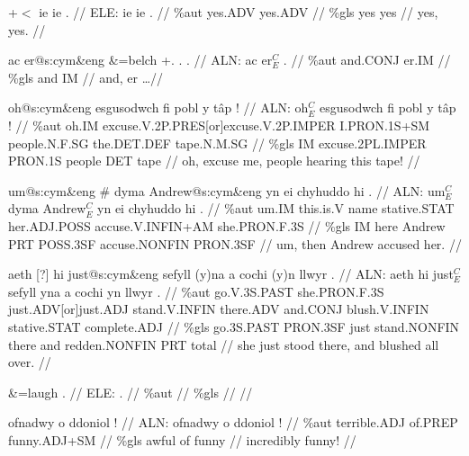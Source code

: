 \documentclass[a4paper,10pt]{article}
\begin{document}
\ex
\begingl[lingstyle=gergl]
\glchat +$<$ ie ie . //
\glsurface ELE:  ie ie .  //
\glauto \%aut  yes{\scriptsize .ADV} yes{\scriptsize .ADV}   //
\glmanual \%gls  yes yes   //
\gleng yes, yes. //
\endgl
\xe

\ex
\begingl[lingstyle=gergl]
\glchat ac er@s:cym\&eng \&=belch +. . . //
\glsurface ALN:  ac er$^{C}_{E}$ .  //
\glauto \%aut  and{\scriptsize .CONJ} er{\scriptsize .IM}   //
\glmanual \%gls  and IM   //
\gleng and, er \dots  //
\endgl
\xe

\ex
\begingl[lingstyle=gergl]
\glchat oh@s:cym\&eng esgusodwch fi pobl y tâp ! //
\glsurface ALN:  oh$^{C}_{E}$ esgusodwch fi pobl y tâp !  //
\glauto \%aut  oh{\scriptsize .IM} excuse{\scriptsize .V.2P.PRES[or]excuse.V.2P.IMPER} I{\scriptsize .PRON.1S+SM} people{\scriptsize .N.F.SG} the{\scriptsize .DET.DEF} tape{\scriptsize .N.M.SG}   //
\glmanual \%gls  IM excuse{\scriptsize .2PL.IMPER} PRON{\scriptsize .1S} people DET tape   //
\gleng oh, excuse me, people hearing this tape! //
\endgl
\xe

\ex
\begingl[lingstyle=gergl]
\glchat um@s:cym\&eng \# dyma Andrew@s:cym\&eng yn ei chyhuddo hi . //
\glsurface ALN:  um$^{C}_{E}$ dyma Andrew$^{C}_{E}$ yn ei chyhuddo hi .  //
\glauto \%aut  um{\scriptsize .IM} this{\scriptsize .is.V} name stative{\scriptsize .STAT} her{\scriptsize .ADJ.POSS} accuse{\scriptsize .V.INFIN+AM} she{\scriptsize .PRON.F.3S}   //
\glmanual \%gls  IM here Andrew PRT POSS{\scriptsize .3SF} accuse{\scriptsize .NONFIN} PRON{\scriptsize .3SF}   //
\gleng um, then Andrew accused her. //
\endgl
\xe

\ex
\begingl[lingstyle=gergl]
\glchat aeth [?] hi just@s:cym\&eng sefyll (y)na a cochi (y)n llwyr . //
\glsurface ALN:  aeth hi just$^{C}_{E}$ sefyll yna a cochi yn llwyr .  //
\glauto \%aut  go{\scriptsize .V.3S.PAST} she{\scriptsize .PRON.F.3S} just{\scriptsize .ADV[or]just.ADJ} stand{\scriptsize .V.INFIN} there{\scriptsize .ADV} and{\scriptsize .CONJ} blush{\scriptsize .V.INFIN} stative{\scriptsize .STAT} complete{\scriptsize .ADJ}   //
\glmanual \%gls  go{\scriptsize .3S.PAST} PRON{\scriptsize .3SF} just stand{\scriptsize .NONFIN} there and redden{\scriptsize .NONFIN} PRT total   //
\gleng she just stood there, and blushed all over. //
\endgl
\xe

\ex
\begingl[lingstyle=gergl]
\glchat \&=laugh . //
\glsurface ELE:  .  //
\glauto \%aut    //
\glmanual \%gls    //
\gleng  //
\endgl
\xe

\ex
\begingl[lingstyle=gergl]
\glchat ofnadwy o ddoniol ! //
\glsurface ALN:  ofnadwy o ddoniol !  //
\glauto \%aut  terrible{\scriptsize .ADJ} of{\scriptsize .PREP} funny{\scriptsize .ADJ+SM}   //
\glmanual \%gls  awful of funny   //
\gleng incredibly funny! //
\endgl
\xe
\end{document}
